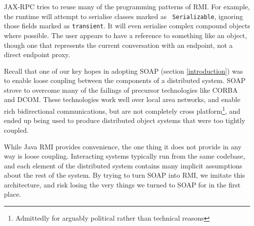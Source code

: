 JAX-RPC tries to reuse many of the programming patterns of RMI. For
example, the runtime will attempt to serialise classes marked as {\tt
Serializable}, ignoring those fields marked as {\tt transient}. It
will even serialise complex compound objects where possible. The user
appears to have a reference to something like an object, though one
that represents the current conversation with an endpoint, not a
direct endpoint proxy.

Recall that one of our key hopes in adopting SOAP (section \ref{introduction})
was to enable loose coupling between the components of a distributed system.
SOAP strove to overcome many of the failings of precursor technologies like
CORBA and DCOM. These technologies work well over local area networks, and
enable rich bidirectional communications, but are not completely cross
platform\footnote{Admittedly for arguably political rather than technical
reasons}, and ended up being used to produce distributed object systems that
were too tightly coupled.

While Java RMI provides convenience, the one thing it does not provide
in any way is loose coupling. Interacting systems typically run from
the same codebase, and each element of the distributed system contains
many implicit assumptions about the rest of the system. By trying to
turn SOAP into RMI, we imitate this architecture, and risk losing the
very things we turned to SOAP for in the first place.





